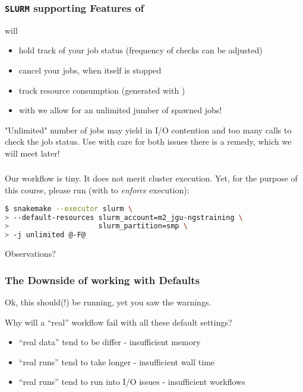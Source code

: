 \begin{frame}[fragile]
  \frametitle{\texttt{SLURM} supporting Features of \Snakemake{}}
  \Snakemake{} will
  \begin{itemize}[<+->]
   \item hold track of your job status (frequency of checks can be adjusted)
   \item cancel your jobs, when itself is stopped
   \item track resource consumption (generated with )
   \item with  we allow for an unlimited jumber of spawned jobs!
  \end{itemize}
  \pause
  \begin{warning}
  	"Unlimited" number of jobs may yield in I/O contention and too many calls to check the job status. Use with care for both issues there is a remedy, which we will meet later!
  \end{warning}
\end{frame}

\begin{frame}[fragile]
  \frametitle{}
  Our workflow is {\tiny tiny}. It does not merit cluster execution. Yet, for the purpose of this course, please run (with  to \emph{enforce} execution):
  \begin{lstlisting}[language=Bash, style=Shell, basicstyle=\footnotesize]
$ snakemake --executor slurm \
> --default-resources slurm_account=m2_jgu-ngstraining \
>                     slurm_partition=smp \
> -j unlimited @-F@
  \end{lstlisting}
  \begin{question}
  	Observations?
  \end{question}
\end{frame}

\begin{frame}
  \frametitle{The Downside of working with Defaults}
  Ok, this should(!) be running, yet you saw the warnings. 
  \begin{question}
  	Why will a ``real'' workflow fail with all these default settings?
  \end{question}
  \pause
  \begin{itemize}
   \item ``real data'' tend to be differ - insufficient memory
   \item ``real runs'' tend to take longer - insufficient wall time
   \item ``real runs'' tend to run into I/O issues - insufficient workflows
  \end{itemize}
\end{frame}

